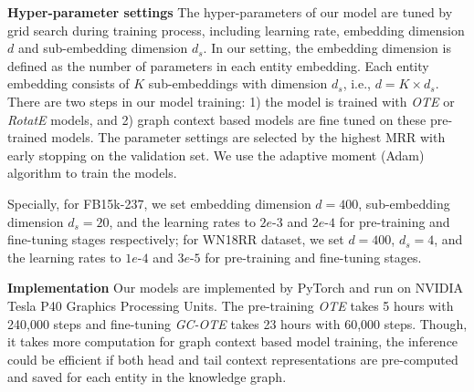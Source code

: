 \documentclass[11pt,a4paper]{article}
\begin{document}
\textbf{Hyper-parameter settings} The hyper-parameters of our model are tuned by grid search during training process, including learning rate, embedding dimension $d$ and sub-embedding dimension $d_s$. In our setting, the embedding dimension is defined as the number of parameters in each entity embedding. Each entity embedding consists of $K$ sub-embeddings with dimension $d_s$, i.e., $d = K \times d_s$. There are two steps in our model training: 1) the model is trained with {\it OTE} or {\it RotatE} models, and 2) graph context based models are fine tuned on these pre-trained models. The parameter settings are selected by the highest MRR with early stopping on the validation set. We use the adaptive moment (Adam) algorithm \cite{kingma2014adam} to train the models.

Specially, for FB15k-237, we set embedding dimension $d=400$, sub-embedding dimension $d_s=20$, and the learning rates to $2e$-$3$ and $2e$-$4$ for pre-training and fine-tuning stages respectively; for WN18RR dataset, we set $d=400$, $d_s= 4$, and the learning rates to $1e$-$4$ and $3e$-$5$ for pre-training and fine-tuning stages. 



\noindent\textbf{Implementation} Our models are implemented by PyTorch and run on NVIDIA Tesla P40 Graphics Processing Units. 
The pre-training {\it OTE} takes 5 hours with 240,000 steps and fine-tuning {\it GC-OTE} takes 23 hours with 60,000 steps. Though, it takes more computation for graph context based model training, the inference could be efficient if both head and tail context representations are pre-computed and saved for each entity in the knowledge graph.  
\end{document}
